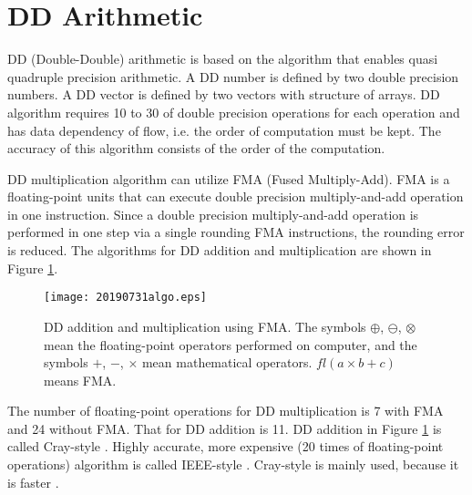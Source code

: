 \documentclass{IOS-Book-Article}
\begin{document}
\section{DD Arithmetic}

DD (Double-Double) arithmetic \cite{DD} is based on the algorithm that enables quasi quadruple precision arithmetic.
A DD number is defined by two double precision numbers. A DD vector is defined by two vectors with structure of arrays.
DD algorithm requires 10 to 30 of double precision operations for each operation and has data dependency of flow, i.e. the order of computation must be kept. The accuracy of this algorithm consists of the order of the computation. 

DD multiplication algorithm \cite{QD} can utilize FMA (Fused Multiply-Add). 
FMA is a floating-point units that can execute double precision multiply-and-add operation in one instruction. Since a double precision multiply-and-add operation is performed in one step via a single rounding FMA instructions, the rounding error is reduced. 
The algorithms for DD addition and multiplication are shown in Figure \ref{fig1}.

\begin{figure}[htbp]
  \begin{center}
    \texttt{[image: 20190731algo.eps]}
    \caption{DD addition and multiplication using FMA. The symbols $\oplus$, $\ominus$, $\otimes$ mean the floating-point operators performed on computer, and the symbols $+$, $-$, $\times$ mean mathematical operators. 
$fl(a\times b+c)$ means FMA.}
\label{fig1}
  \end{center}
\end{figure}

The number of floating-point operations for DD multiplication is 7 with FMA and 24 without FMA.
That for DD addition is 11. DD addition in Figure \ref{fig1} is called Cray-style \cite{ichi}. Highly accurate, more expensive (20 times of floating-point operations) algorithm is called IEEE-style \cite{ichi}. Cray-style is mainly used, because it is faster \cite{DDBLAS}. 
\end{document}
